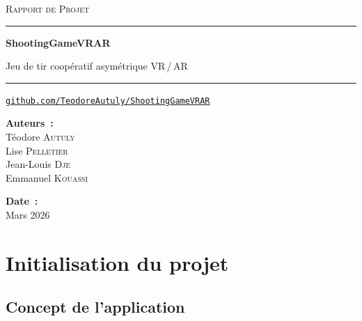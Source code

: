 \documentclass[12pt, a4paper]{article}
\begin{document}
\begin{titlepage}
  \pagecolor{primary}
  \color{white}
  \vspace*{2cm}
  \begin{center}
    {\large\scshape Rapport de Projet}\par
    \vspace{0.5cm}
    {\color{white!60}\rule{0.5\linewidth}{0.6pt}}\par
    \vspace{1.2cm}
    {\fontsize{30}{36}\selectfont\bfseries ShootingGameVRAR}\par
    \vspace{0.5cm}
    {\large Jeu de tir coopératif asymétrique VR\,/\,AR}\par
    \vspace{0.8cm}
    {\color{white!60}\rule{0.5\linewidth}{0.6pt}}\par
    \vspace{1.5cm}
    \href{https://github.com/TeodoreAutuly/ShootingGameVRAR/tree/main}{%
      \textcolor{white!80}{\small\texttt{github.com/TeodoreAutuly/ShootingGameVRAR}}}
  \end{center}
  \vfill
  \begin{minipage}{0.55\linewidth}
    \textbf{Auteurs~:}\\[6pt]
    Téodore \textsc{Autuly}\\
    Lise \textsc{Pelletier}\\
    Jean-Louis \textsc{Dje}\\
    Emmanuel \textsc{Kouassi}
  \end{minipage}
  \hfill
  \begin{minipage}{0.35\linewidth}\raggedleft
    \textbf{Date~:}\\[6pt]
    Mars 2026
  \end{minipage}
  \vspace{1.5cm}
\end{titlepage}
\nopagecolor


\tableofcontents
\newpage

\section{Initialisation du projet}

\subsection{Concept de l'application}
\end{document}
